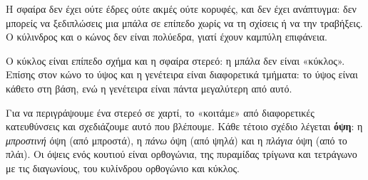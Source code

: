 Η σφαίρα δεν έχει ούτε έδρες ούτε ακμές ούτε κορυφές, και δεν έχει ανάπτυγμα: δεν μπορείς να ξεδιπλώσεις μια μπάλα σε επίπεδο χωρίς να τη σχίσεις ή να την τραβήξεις. Ο κύλινδρος και ο κώνος δεν είναι πολύεδρα, γιατί έχουν καμπύλη επιφάνεια.

\begin{prosoxi}
Ο κύκλος είναι επίπεδο σχήμα και η σφαίρα στερεό: η μπάλα δεν είναι «κύκλος». Επίσης στον κώνο το ύψος και η γενέτειρα είναι διαφορετικά τμήματα: το ύψος είναι κάθετο στη βάση, ενώ η γενέτειρα είναι πάντα μεγαλύτερη από αυτό.
\end{prosoxi}


Για να περιγράψουμε ένα στερεό σε χαρτί, το «κοιτάμε» από διαφορετικές κατευθύνσεις και σχεδιάζουμε αυτό που βλέπουμε. Κάθε τέτοιο σχέδιο λέγεται \textbf{όψη}: η \emph{μπροστινή} όψη (από μπροστά), η \emph{πάνω} όψη (από ψηλά) και η \emph{πλάγια} όψη (από το πλάι). Οι όψεις ενός κουτιού είναι ορθογώνια, της πυραμίδας τρίγωνα και τετράγωνο με τις διαγωνίους, του κυλίνδρου ορθογώνιο και κύκλος.

\begin{center}
\end{center}

